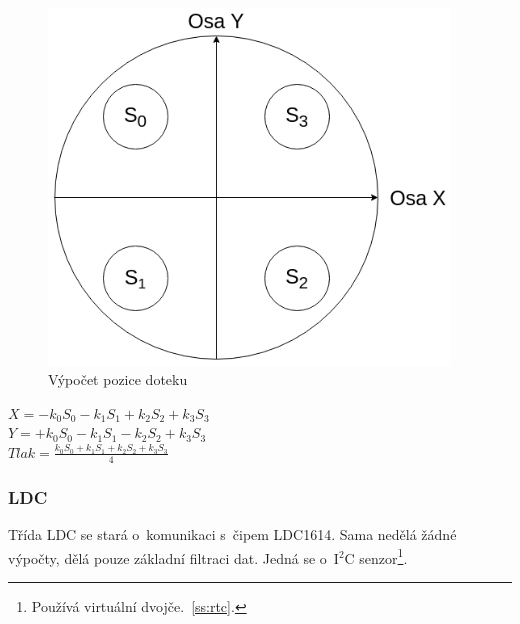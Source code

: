 \begin{figure}[H]
    \begin{small}
        \begin{center}
            \includegraphics[width=0.95\textwidth]{img/Touchpad_calculation.png}
        \end{center}
        \caption{Výpočet pozice doteku}
        \label{fig:touchpad_calculation}
    \end{small}
\end{figure}

\begin{listedequation}[H]
    \begin{center}
        $X = -k_0S_0 -k_1S_1 +k_2S_2 +k_3S_3$\\
        $Y = +k_0S_0 -k_1S_1 -k_2S_2 +k_3S_3$\\
        $Tlak = \frac{k_0S_0 +k_1S_1 +k_2S_2 +k_3S_3}{4}$
    \end{center}
    \caption{Výpočet parametrů doteku}
    \label{eq:touchpad_calculation_X}
\end{listedequation}

\subsubsection{LDC}

Třída LDC se stará o~komunikaci s~čipem LDC1614.
Sama nedělá žádné výpočty, dělá pouze základní filtraci dat.
Jedná se o~I$^2$C senzor\footnote{Používá virtuální dvojče.~\autoref{ss:rtc}.}.

